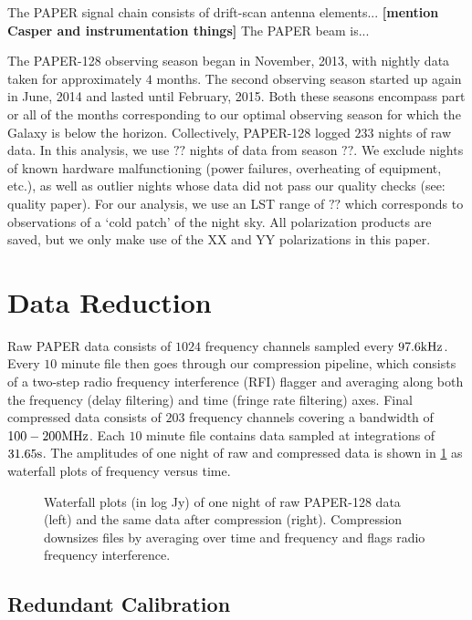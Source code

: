 \documentclass[preprint2,numberedappendix,tighten,twocolappendix]{aastex6}  %
\newcommand{\cc}[1]{{\color{purple} \textbf{[#1]}}}
\begin{document}
The PAPER signal chain consists of drift-scan antenna elements... \cc{mention Casper and instrumentation things}
The PAPER beam is...

The PAPER-128 observing season began in November, 2013, with nightly data taken for approximately $4$ months. The second observing season started up again in June, 2014 and lasted until February, 2015. Both these seasons encompass part or all of the months corresponding to our optimal observing season for which the Galaxy is below the horizon. Collectively, PAPER-128 logged $233$ nights of raw data. In this analysis, we use $??$ nights of data from season $??$. We exclude nights of known hardware malfunctioning (power failures, overheating of equipment, etc.), as well as outlier nights whose data did not pass our quality checks (see: quality paper). For our analysis, we use an LST range of $??$ which corresponds to observations of a `cold patch' of the night sky. All polarization products are saved, but we only make use of the XX and YY polarizations in this paper.

\section{Data Reduction}
\label{sec:Cal}

Raw PAPER data consists of $1024$ frequency channels sampled every $97.6 {\rm kHz}$. Every $10$ minute file then goes through our compression pipeline, which consists of a two-step radio frequency interference (RFI) flagger and averaging along both the frequency (delay filtering) and time (fringe rate filtering) axes. Final compressed data consists of $203$ frequency channels covering a bandwidth of $100-200 {\rm MHz}$. Each $10$ minute file contains data sampled at integrations of $31.65 {\rm s}$. The amplitudes of one night of raw and compressed data is shown in \ref{fig:raw} as waterfall plots of frequency versus time. 

\begin{figure}[!]
	\centering
	\caption{Waterfall plots (in log Jy) of one night of raw PAPER-128 data (left) and the same data after compression (right). Compression downsizes files by averaging over time and frequency and flags radio frequency interference.}
	\label{fig:raw}
\end{figure}

\subsection{Redundant Calibration}
\end{document}
